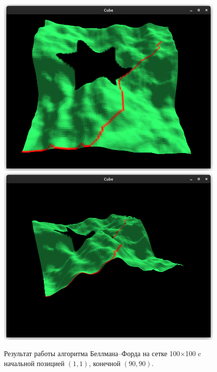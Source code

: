 \begin{figure}[h]
    \centering
    \includegraphics[scale=0.5]{content/bf-top.png}
    \includegraphics[scale=0.5]{content/bf.png}
    \caption{Результат работы алгоритма Беллмана--Форда на сетке 100$\times$100 c начальной позицией $(1, 1)$, конечной $(90, 90)$.}
\end{figure}
\clearpage